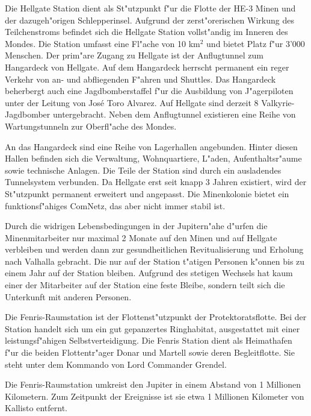 Die Hellgate Station dient als St"utzpunkt f"ur die Flotte der HE-3 Minen und der dazugeh"origen Schlepperinsel. Aufgrund der zerst"orerischen Wirkung des Teilchenstroms befindet sich die Hellgate Station vollst"andig im Inneren des Mondes. Die Station umfasst eine Fl"ache von 10 km$^{2}$ und bietet Platz f"ur 3'000 Menschen. Der prim"are Zugang zu Hellgate ist der Anflugtunnel zum Hangardeck von Hellgate. Auf dem Hangardeck herrscht permanent ein reger Verkehr von an- und abfliegenden F"ahren und Shuttles. Das Hangardeck beherbergt auch eine Jagdbomberstaffel f"ur die Ausbildung von J"agerpiloten unter der Leitung von Jos\'{e} \frqq{}Toro\flqq{} Alvarez. Auf Hellgate sind derzeit 8 Valkyrie-Jagdbomber untergebracht. Neben dem Anflugtunnel existieren eine Reihe von Wartungstunneln zur Oberfl"ache des Mondes.

An das Hangardeck sind eine Reihe von Lagerhallen angebunden. Hinter diesen Hallen befinden sich die Verwaltung, Wohnquartiere, L"aden, Aufenthaltsr"aume sowie technische Anlagen. Die Teile der Station sind durch ein ausladendes Tunnelsystem verbunden. Da Hellgate erst seit knapp 3 Jahren existiert, wird der St"utzpunkt permanent erweitert und angepasst. Die Minenkolonie bietet ein funktionsf"ahiges ComNetz, das aber nicht immer stabil ist.

Durch die widrigen Lebensbedingungen in der Jupitern"ahe d"urfen die Minenmitarbeiter nur maximal 2 Monate auf den Minen und auf Hellgate verbleiben und werden dann zur gesundheitlichen Revitualisierung und Erholung nach Valhalla gebracht. Die nur auf der Station t"atigen Personen k"onnen bis zu einem Jahr auf der Station bleiben. Aufgrund des stetigen Wechsels hat kaum einer der Mitarbeiter auf der Station eine feste Bleibe, sondern teilt sich die Unterkunft mit anderen Personen.

Die Fenris-Raumstation ist der Flottenst"utzpunkt der Protektoratsflotte. Bei der Station handelt sich um ein gut gepanzertes Ringhabitat, ausgestattet mit einer leistungsf"ahigen Selbstverteidigung. Die Fenris Station dient als Heimathafen f"ur die beiden Flottentr"ager Donar und Martell sowie deren Begleitflotte. Sie steht unter dem Kommando von Lord Commander Grendel.

Die Fenris-Raumstation umkreist den Jupiter in einem Abstand von 1 Millionen Kilometern. Zum Zeitpunkt der Ereignisse ist sie etwa 1 Millionen Kilometer von Kallisto entfernt.


